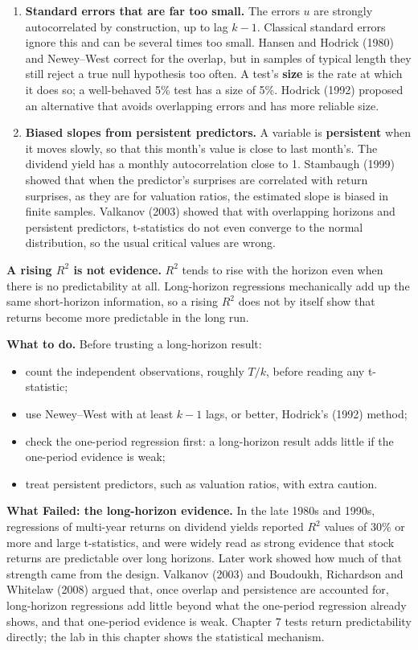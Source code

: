 \begin{enumerate}
  \item \textbf{Standard errors that are far too small.} The errors $u$ are strongly autocorrelated by construction, up to lag $k - 1$. Classical standard errors ignore this and can be several times too small. Hansen and Hodrick (1980) and Newey--West correct for the overlap, but in samples of typical length they still reject a true null hypothesis too often. A test's \textbf{size} is the rate at which it does so; a well-behaved 5\% test has a size of 5\%. Hodrick (1992) proposed an alternative that avoids overlapping errors and has more reliable size.
  \item \textbf{Biased slopes from persistent predictors.} A variable is \textbf{persistent} when it moves slowly, so that this month's value is close to last month's. The dividend yield has a monthly autocorrelation close to 1. Stambaugh (1999) showed that when the predictor's surprises are correlated with return surprises, as they are for valuation ratios, the estimated slope is biased in finite samples. Valkanov (2003) showed that with overlapping horizons and persistent predictors, t-statistics do not even converge to the normal distribution, so the usual critical values are wrong.
\end{enumerate}

\textbf{A rising $R^2$ is not evidence.} $R^2$ tends to rise with the horizon
even when there is no predictability at all. Long-horizon regressions
mechanically add up the same short-horizon information, so a rising $R^2$ does
not by itself show that returns become more predictable in the long run.

\textbf{What to do.} Before trusting a long-horizon result:

\begin{itemize}
  \item count the independent observations, roughly $T/k$, before reading any t-statistic;
  \item use Newey--West with at least $k-1$ lags, or better, Hodrick's (1992) method;
  \item check the one-period regression first: a long-horizon result adds little if the one-period evidence is weak;
  \item treat persistent predictors, such as valuation ratios, with extra caution.
\end{itemize}

\begin{callout}
\textbf{What Failed: the long-horizon evidence.} In the late 1980s and 1990s, regressions of multi-year returns on dividend yields reported $R^2$ values of 30\% or more and large t-statistics, and were widely read as strong evidence that stock returns are predictable over long horizons. Later work showed how much of that strength came from the design. Valkanov (2003) and Boudoukh, Richardson and Whitelaw (2008) argued that, once overlap and persistence are accounted for, long-horizon regressions add little beyond what the one-period regression already shows, and that one-period evidence is weak. Chapter 7 tests return predictability directly; the lab in this chapter shows the statistical mechanism.
\end{callout}

